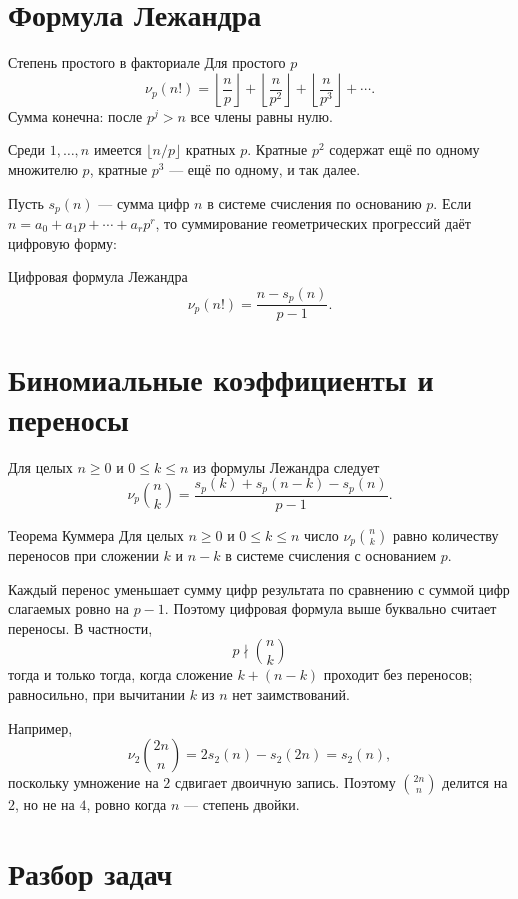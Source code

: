 \section{Формула Лежандра}

\begin{theorembox}{Степень простого в факториале}
Для простого $p$
\[
  \boxed{
  \nu_p(n!)=
  \left\lfloor\frac np\right\rfloor+
  \left\lfloor\frac n{p^2}\right\rfloor+
  \left\lfloor\frac n{p^3}\right\rfloor+\cdots}.
\]
Сумма конечна: после $p^j>n$ все члены равны нулю.
\end{theorembox}

Среди $1,\ldots,n$ имеется $\lfloor n/p\rfloor$ кратных $p$.
Кратные $p^2$ содержат ещё по одному множителю $p$, кратные $p^3$ ---
ещё по одному, и так далее.

Пусть $s_p(n)$ --- сумма цифр $n$ в системе счисления по основанию
$p$. Если $n=a_0+a_1p+\cdots+a_rp^r$, то суммирование геометрических
прогрессий даёт цифровую форму:
\begin{theorembox}{Цифровая формула Лежандра}
\[
  \boxed{\nu_p(n!)=\frac{n-s_p(n)}{p-1}}.
\]
\end{theorembox}

\section{Биномиальные коэффициенты и переносы}

Для целых $n\ge0$ и $0\le k\le n$ из формулы Лежандра следует
\[
  \nu_p\binom nk
  =\frac{s_p(k)+s_p(n-k)-s_p(n)}{p-1}.
\]

\begin{theorembox}{Теорема Куммера}
Для целых $n\ge0$ и $0\le k\le n$ число
$\nu_p\binom nk$ равно количеству переносов при сложении
$k$ и $n-k$ в системе счисления с основанием $p$.
\end{theorembox}

Каждый перенос уменьшает сумму цифр результата по сравнению с суммой
цифр слагаемых ровно на $p-1$. Поэтому цифровая формула выше буквально
считает переносы. В частности,
\[
  p\nmid\binom nk
\]
тогда и только тогда, когда сложение $k+(n-k)$ проходит без переносов;
равносильно, при вычитании $k$ из $n$ нет заимствований.

Например,
\[
  \nu_2\binom{2n}{n}
  =2s_2(n)-s_2(2n)=s_2(n),
\]
поскольку умножение на $2$ сдвигает двоичную запись. Поэтому
$\binom{2n}{n}$ делится на $2$, но не на $4$, ровно когда $n$ ---
степень двойки.

\section{Разбор задач}

